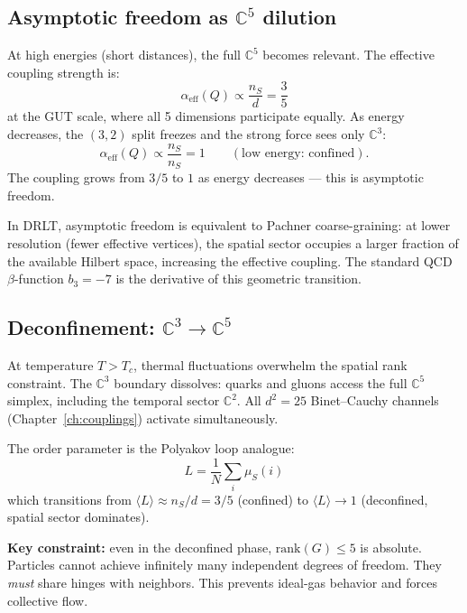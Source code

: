 \documentclass[12pt]{article}
\theoremstyle{remark}
\theoremstyle{definition}
\begin{document}
\subsection{Asymptotic freedom as $\mathbb{C}^5$ dilution}

At high energies (short distances), the full $\mathbb{C}^5$ becomes relevant. The effective coupling strength is:
\begin{equation}
\alpha_\text{eff}(Q) \propto \frac{n_S}{d} = \frac{3}{5}
\end{equation}
at the GUT scale, where all 5 dimensions participate equally. As energy decreases, the $(3,2)$ split freezes and the strong force sees only $\mathbb{C}^3$:
\begin{equation}
\alpha_\text{eff}(Q) \propto \frac{n_S}{n_S} = 1 \qquad (\text{low energy: confined}).
\end{equation}
The coupling grows from $3/5$ to $1$ as energy decreases --- this is asymptotic freedom.

In DRLT, asymptotic freedom is equivalent to Pachner coarse-graining: at lower resolution (fewer effective vertices), the spatial sector occupies a larger fraction of the available Hilbert space, increasing the effective coupling. The standard QCD $\beta$-function $b_3 = -7$ is the derivative of this geometric transition.

\subsection{Deconfinement: $\mathbb{C}^3 \to \mathbb{C}^5$}

At temperature $T > T_c$, thermal fluctuations overwhelm the spatial rank constraint. The $\mathbb{C}^3$ boundary dissolves: quarks and gluons access the full $\mathbb{C}^5$ simplex, including the temporal sector $\mathbb{C}^2$. All $d^2 = 25$ Binet--Cauchy channels (Chapter~\ref{ch:couplings}) activate simultaneously.

The order parameter is the Polyakov loop analogue:
\begin{equation}
L = \frac{1}{N}\sum_i \mu_S(i)
\end{equation}
which transitions from $\langle L\rangle \approx n_S/d = 3/5$ (confined) to $\langle L\rangle \to 1$ (deconfined, spatial sector dominates).

\textbf{Key constraint:} even in the deconfined phase, $\text{rank}(G) \leq 5$ is absolute. Particles cannot achieve infinitely many independent degrees of freedom. They \emph{must} share hinges with neighbors. This prevents ideal-gas behavior and forces collective flow.
\end{document}
